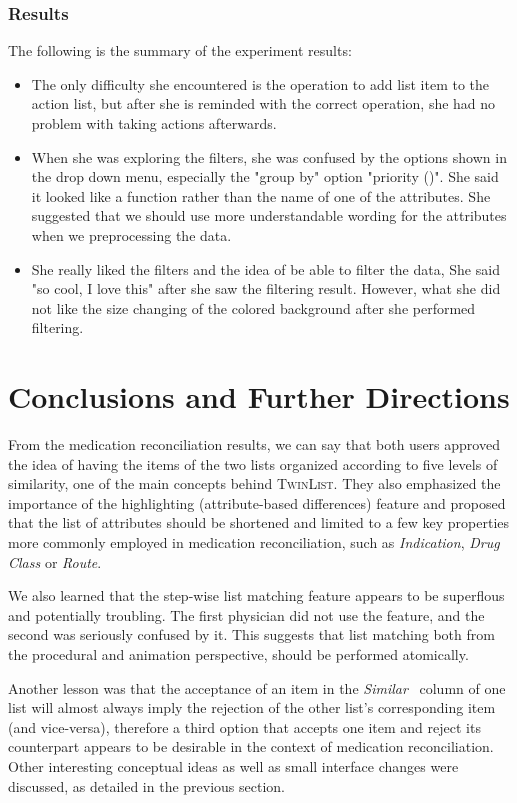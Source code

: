 \documentclass{chi2009}
\newcommand{\TwinList}{\textsc{TwinList}}
\newcommand{\Similar}{\textit{Similar}}
\begin{document}
\subsubsection{Results}
The following is the summary of the experiment results:
\begin{itemize}
\item The only difficulty she encountered is the operation to add list item to the action list, but after she is reminded with the correct operation, she had no problem with taking actions afterwards.

\item When she was exploring the filters, she was confused by the options shown in the drop down menu, especially the "group by" option  "priority ()". She said it looked like a function rather than the name of one of the attributes. She suggested that we should use more understandable wording for the attributes when we preprocessing the data. 
\item She really liked the filters and the idea of be able to filter the data, She said "so cool, I love this" after she saw the filtering result. However, what she did not like the size changing of the colored background after she performed filtering. 

\end{itemize}


\section{Conclusions and Further Directions}


From the medication reconciliation results, we can say that both users approved the idea of having the items of the two lists organized according to five levels of similarity, one of the main concepts behind \TwinList. They also emphasized the importance of the highlighting (attribute-based differences) feature and proposed that the list of attributes should be shortened and limited to a few key properties more commonly employed in medication reconciliation, such as \textit{Indication}, \textit{Drug Class} or \textit{Route}.

We also learned that the step-wise list matching feature appears to be superflous and potentially troubling. The first physician did not use the feature, and the second was seriously confused by it. This suggests that list matching both from the procedural and animation perspective, should be performed atomically. 

Another lesson was that the acceptance of an item in the \Similar~ column of one list will almost always imply the rejection of the other list's corresponding item (and vice-versa), therefore a third option that accepts one item and reject its counterpart appears to be desirable in the context of medication reconciliation. Other interesting conceptual ideas as well as small interface changes were discussed, as detailed in the previous section.





\end{document}
